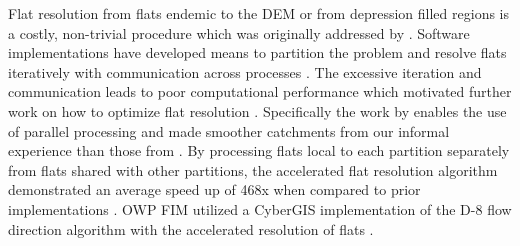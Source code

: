 Flat resolution from flats endemic to the DEM or from depression filled regions is a costly, non-trivial procedure which was originally addressed by .  
Software implementations have developed means to partition the problem and resolve flats iteratively with communication across processes \cite{tarboton2009generalized,tesfa2011extraction,wallis2009parallel,tarboton2005terrain}.
The excessive iteration and communication leads to poor computational performance which motivated further work on how to optimize flat resolution \cite{survila2016scalable,barnes2014efficient}.
Specifically the work by  enables the use of parallel processing and made smoother catchments from our informal experience than those from .
By processing flats local to each partition separately from flats shared with other partitions, the accelerated flat resolution algorithm demonstrated an average speed up of 468x when compared to prior implementations \cite{survila2016scalable}.
OWP FIM utilized a CyberGIS implementation of the D-8 flow direction algorithm with the accelerated resolution of flats \cite{survila2016scalable,cybergis2016}.
%
